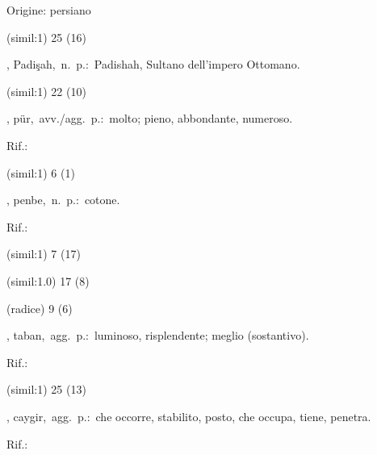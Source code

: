 \begin{glossario}{Origine: persiano}
\begin{subvocedue}
\item[(simil:1)]   25 (16)
\end{subvocedue}
\item[{\color{colorlowref}\spzrl{pAdi^sAah}},] {\sf Padişah},\ n.\ p.:\ Padishah, Sultano dell'impero Ottomano.
\begin{subvocedue}
\item[(simil:1)]   22 (10)
\end{subvocedue}
\item[{\color{colorlowref}\spzrl{pur}},] {\sf pür},\ avv./agg.\ p.:\ molto; pieno, abbondante, numeroso.
\begin{subvocedue}
\item[Rif.:] 
\end{subvocedue}
\begin{subvocedue}
\item[(simil:1)]   6 (1)
\end{subvocedue}
\item[{\color{colorlowref}\spzrl{penb.H}},] {\sf penbe},\ n.\ p.:\ cotone.
\begin{subvocedue}
\item[Rif.:] 
\end{subvocedue}
\begin{subvocedue}
\item[(simil:1)]   7 (17)
\item[(simil:1.0)]   17 (8)
\item[(radice)]   9 (6)
\end{subvocedue}
\item[{\color{colorlowref}\spzrl{tAbAn}},] {\sf taban},\ agg.\ p.:\ luminoso, risplendente; meglio (sostantivo).
\begin{subvocedue}
\item[Rif.:] 
\end{subvocedue}
\begin{subvocedue}
\item[(simil:1)]   25 (13)
\end{subvocedue}
\item[{\color{colorlowref}\spzrl{^gAygIr}},] {\sf caygir},\ agg.\ p.:\ che occorre, stabilito, posto, che occupa, tiene, penetra.
\begin{subvocedue}
\item[Rif.:] 
\end{subvocedue}

\end{glossario}
